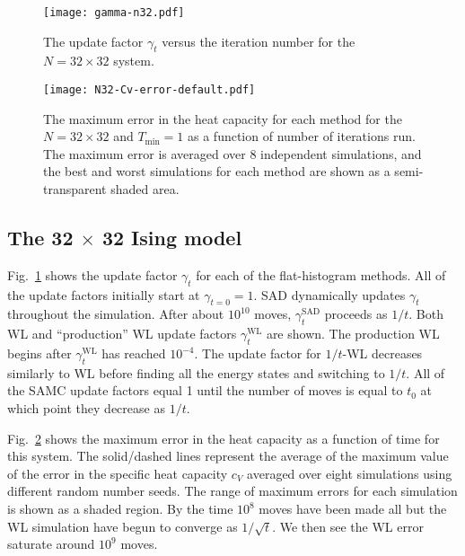 \documentclass[letterpaper,twocolumn,amsmath,amssymb,pre,aps,10pt]{revtex4-1}
\begin{document}
\begin{figure}
\texttt{[image: gamma-n32.pdf]}
  \caption{
  The update factor $\gamma_t$ versus the iteration number for the $N=32 \times 32$
  system.}
  \label{fig:N32-gamma}
\end{figure}

\begin{figure}
  \texttt{[image: N32-Cv-error-default.pdf]}
  \caption{The maximum error in the heat capacity for each method for the $N=32 \times 32$ and $T_{\min} = 1$ as a function of number of iterations run.  The maximum error is averaged over 8 independent simulations, and the best and worst simulations for each method are shown as a semi-transparent shaded area.}
  \label{fig:N32-cv-error}
\end{figure}


\subsection{The 32 $\times$ 32 Ising model}
Fig.~\ref{fig:N32-gamma} shows the update factor $\gamma_t$ for each of the flat-histogram methods. All of the update factors initially start at $\gamma_{t=0} = 1$. SAD dynamically updates $\gamma_t$ throughout the simulation. After about $10^{10}$ moves, $\gamma^{\text{SAD}}_t$ proceeds as $1/t$. Both WL and ``production'' WL update factors $\gamma^{\text{WL}}_t$ are shown. The production WL begins after $\gamma^{\text{WL}}_t$ has reached $10^{-4}$. The update factor for $1/t$-WL decreases similarly to WL before finding all the energy states and switching to $1/t$. All of the SAMC update factors equal 1 until the number of moves is equal to $t_0$ at which point they decrease as $1/t$.

Fig.~\ref{fig:N32-cv-error} shows the maximum error in the heat capacity as a function of time for
this system. The solid/dashed lines
represent the average of the maximum value of the error in the specific heat capacity $c_V$ averaged
over eight simulations using different random number seeds. The range of maximum
errors for each simulation is shown as a shaded region. By
the time $10^8$ moves have been made all but the WL simulation have begun to
converge as $1/\sqrt{t}$. We then see the WL error saturate around $10^9$ moves.
\end{document}

